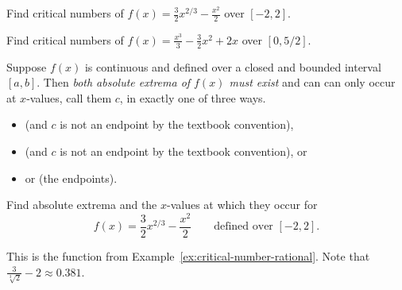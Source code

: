 \documentclass[../main.tex]{subfiles}
\begin{document}
\begin{example} \label{ex:critical-number-rational}
  Find critical numbers of \(f(x) = \frac{3}{2} x^{2/3} - \frac{x^{2}}{2}\) over \([-2,2]\).

  \blanks*
\end{example}

\begin{exercise} \label{ex:critical-number-polynomial}
  Find critical numbers of \(f(x) = \frac{x^{3}}{3} - \frac{3}{2}x^{2} + 2x\) over \([0, 5/2]\).

  \blanks*
\end{exercise}
\clearpage


\begin{thm} \label{page:extrema-strategy} \label{thm:closed-interval-method}
  Suppose \(f(x)\) is continuous and defined over a closed and bounded interval \([a,b]\). 
  Then \emph{both absolute extrema of \(f(x)\) must exist} and can can only occur at \(x\)-values, call them \(c\), in exactly one of three ways.
  \begin{itemize}
    \item {} (and \(c\) is not an endpoint by the textbook convention),
    \item {} (and \(c\) is not an endpoint by the textbook convention), or
    \item {} or  (the endpoints).
  \end{itemize}
  
\end{thm}

\begin{center}
  
\end{center}

\begin{example}
  Find absolute extrema and the \(x\)-values at which they occur for
  \[
    f(x) = \frac{3}{2} x^{2/3} - \frac{x^{2}}{2} \qquad\text{defined over } [-2,2].
  \]

  This is the function from Example~\ref{ex:critical-number-rational}. Note that \(\frac{3}{\sqrt[3]{2}}-2 \approx 0.381\).

  \blanks*
\end{example}
\clearpage
\end{document}

